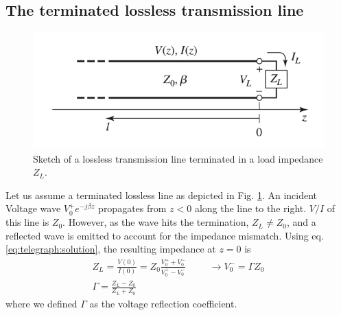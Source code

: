 \subsection{The terminated lossless transmission line}
\begin{figure}
	\centering
	\includegraphics[width=0.4\linewidth]{chapter-theory/figs-RF/pozar_terminated_lossless}
	\caption{Sketch of a lossless transmission line terminated in a load impedance $Z_L$.}
	\label{fig:pozarterminatedlossless}
\end{figure}
Let us assume a terminated lossless line as depicted in Fig. \ref{fig:pozarterminatedlossless}. An incident Voltage wave $V_0^+ e^{-j\beta z}$ propagates from $z<0$ along the line to the right. $V/I$ of this line is $Z_0$. However, as the wave hits the termination, $Z_L \neq Z_0$, and a reflected wave is emitted to account for the impedance mismatch. Using eq. \ref{eq:telegraph:solution}, the resulting impedance at $z=0$ is 
\begin{align}
Z_L=\frac{V(0)}{I(0)}=Z_0\frac{V_0^++V_0^-}{V_0^+-V_0^-} \hspace{1cm} \rightarrow V_0^-=\Gamma Z_0 \\%
\Gamma = \frac{Z_L-Z_0}{Z_L+Z_0}
\end{align} 
where we defined $\Gamma$ as the voltage reflection coefficient.

